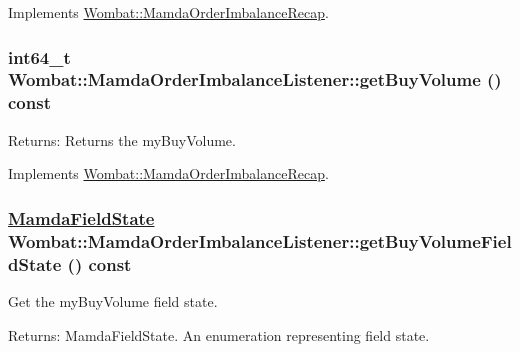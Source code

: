 Implements \hyperlink{classWombat_1_1MamdaOrderImbalanceRecap_0ac5312b01a0b1bf7f3347332280a6dd}{Wombat::Mamda\-Order\-Imbalance\-Recap}.\hypertarget{classWombat_1_1MamdaOrderImbalanceListener_7f5cb04154fe3ec2673e616a5958b9f2}{
\subsubsection[getBuyVolume]{\setlength{\rightskip}{0pt plus 5cm}int64\_\-t Wombat::Mamda\-Order\-Imbalance\-Listener::get\-Buy\-Volume () const}}
\label{classWombat_1_1MamdaOrderImbalanceListener_7f5cb04154fe3ec2673e616a5958b9f2}


\begin{Desc}
\item[Returns:]Returns the my\-Buy\-Volume. \end{Desc}


Implements \hyperlink{classWombat_1_1MamdaOrderImbalanceRecap_f5d0601b43944ff04a80d98601a041da}{Wombat::Mamda\-Order\-Imbalance\-Recap}.\hypertarget{classWombat_1_1MamdaOrderImbalanceListener_979197d028cd40ebe9d689c52377f02c}{
\subsubsection[getBuyVolumeFieldState]{\setlength{\rightskip}{0pt plus 5cm}\hyperlink{namespaceWombat_93aac974f2ab713554fd12a1fa3b7d2a}{Mamda\-Field\-State} Wombat::Mamda\-Order\-Imbalance\-Listener::get\-Buy\-Volume\-Field\-State () const}}
\label{classWombat_1_1MamdaOrderImbalanceListener_979197d028cd40ebe9d689c52377f02c}


Get the my\-Buy\-Volume field state. 

\begin{Desc}
\item[Returns:]Mamda\-Field\-State. An enumeration representing field state. \end{Desc}


